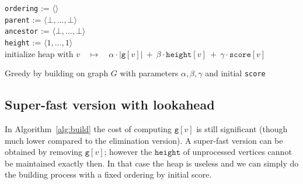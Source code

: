 \documentclass{timgad}
\begin{document}
\begin{algorithm}[h]
 \texttt{ordering} := $\langle\rangle$\\
 \texttt{parent} := $\langle\bot,\dots,\bot\rangle$\\ 
 \texttt{ancestor} := $\langle\bot,\dots,\bot\rangle$\\  
 \texttt{height} := $\langle 1,\dots,1\rangle$\\ 
 initialize heap with $v \quad \mapsto \quad \alpha \cdot |\texttt{g}[v]|\ +\ \beta \cdot \texttt{height}[v]\ +\ \gamma \cdot \texttt{score}[v]$\\
 \caption{Greedy by building on graph $G$ with parameters $\alpha,\beta,\gamma$ and initial \texttt{score}\hspace*{-2em}}
 \label{alg:build}
\end{algorithm}

\subsection{Super-fast version with lookahead}
In Algorithm~\ref{alg:build}  the cost of computing $\texttt{g}[v]$ is still significant (though much lower compared to the elimination version).
A super-fast version can be obtained by removing $\texttt{g}[v]$; however the $\texttt{height}$ of unprocessed vertices cannot be maintained exactly then.
In that case the heap is useless and we can simply do the building process with a fixed ordering by initial score.
\end{document}
